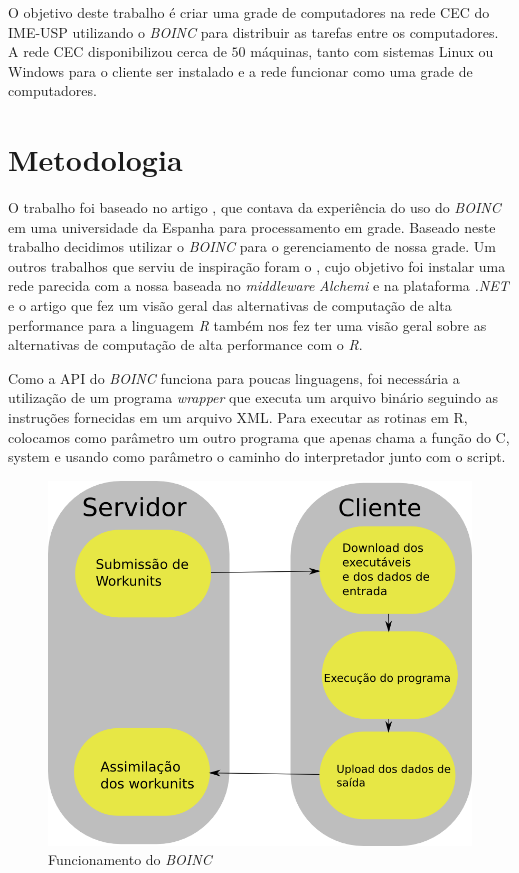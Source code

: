 \documentclass[b1]{sciposter}
\begin{document}
\begin{multicols}{2}
O objetivo deste trabalho é criar uma grade de computadores na rede CEC do IME-USP utilizando o \textit{BOINC} para distribuir as tarefas
entre os computadores. A rede CEC disponibilizou cerca de $50$ máquinas, tanto com sistemas Linux ou Windows para o cliente
ser instalado e a rede funcionar como uma grade de computadores.

\section{Metodologia}

O trabalho foi baseado no artigo \cite{boinc}, que contava da experiência do uso do \textit{BOINC} em uma universidade da Espanha para processamento em grade. Baseado neste trabalho decidimos utilizar o \textit{BOINC} para o gerenciamento de nossa grade. Um  outros trabalhos que serviu de inspiração foram o \cite{Dias}, cujo objetivo foi instalar uma rede parecida com a nossa baseada no \textit{middleware} \textit{Alchemi} e na plataforma \textit{.NET} e o artigo \cite{epub8991} que fez um visão geral das alternativas de computação de alta performance 
 para a linguagem \textit{R} também nos fez ter uma visão geral sobre as alternativas de computação de alta performance com o \textit{R}.

Como a API do \textit{BOINC} funciona para poucas linguagens, foi necessária a utilização de um programa 
\textit{wrapper} que executa um arquivo binário seguindo as instruções fornecidas em um arquivo XML. Para 
executar as rotinas em R, colocamos como parâmetro um outro programa que apenas chama a função do C, system e usando como parâmetro o caminho 
do interpretador junto com o script. 

\begin{figure}[!h]
  \centering
  \includegraphics[scale=0.8]{boinc-schema.png}
  \caption{Funcionamento do \textit{BOINC}}
  \label{boinc_funcionamento}
\end{figure}



\end{multicols}
\end{document}
